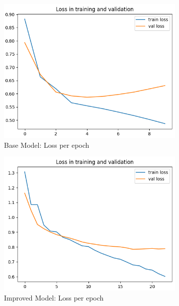 \documentclass[
a4paper,     %
10pt         %
]{scrartcl}  %
\begin{document}
\begin{figure}[h]
    \begin{subfigure}{.5\textwidth}
        \centering
        \includegraphics[width=\linewidth]{figures/base_model_loss}
        \caption{Base Model: Loss per epoch}
    \end{subfigure}
    \begin{subfigure}{.5\textwidth}
        \centering
        \includegraphics[width=\linewidth]{figures/reg_model_loss}
        \caption{Improved Model: Loss per epoch}
    \end{subfigure}
    \begin{subfigure}{.5\textwidth}

\end{subfigure}
\end{figure}
\end{document}
